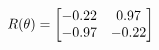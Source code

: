 \documentclass[preview]{standalone}
\begin{document}
\begin{align*}
\special{dvisvgm:raw <g id='unique000'>}R(\theta) = \begin{bmatrix}-0.22 & 0.97\\-0.97 & -0.22\end{bmatrix}\special{dvisvgm:raw </g>}
\end{align*}
\end{document}
